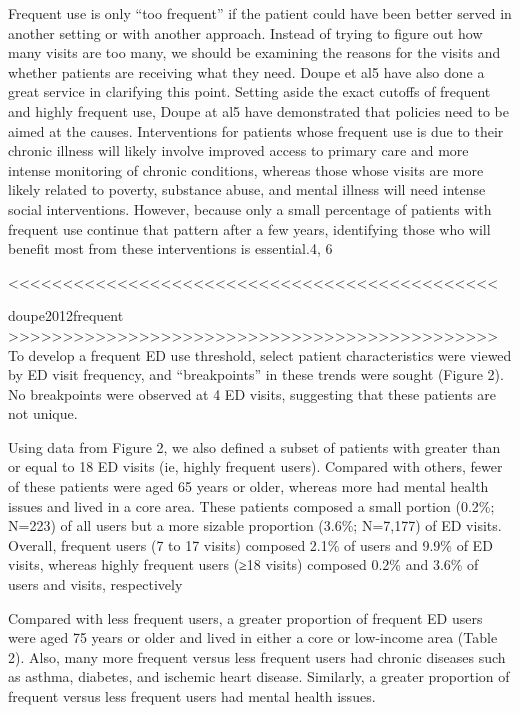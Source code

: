 Frequent use is only “too frequent” if the patient could have been better served in another setting or with another approach. Instead of trying to figure out how many visits are too many, we should be examining the reasons for the visits and whether patients are receiving what they need. Doupe et al5 have also done a great service in clarifying this point. Setting aside the exact cutoffs of frequent and highly frequent use, Doupe at al5 have demonstrated that policies need to be aimed at the causes. Interventions for patients whose frequent use is due to their chronic illness will likely involve improved access to primary care and more intense monitoring of chronic conditions, whereas those whose visits are more likely related to poverty, substance abuse, and mental illness will need intense social interventions. However, because only a small percentage of patients with frequent use continue that pattern after a few years, identifying those who will benefit most from these interventions is essential.4, 6

<<<<<<<<<<<<<<<<<<<<<<<<<<<<<<<<<<<<<<<<<<<<<



doupe2012frequent
>>>>>>>>>>>>>>>>>>>>>>>>>>>>>>>>>>>>>>>>>>>>>
To develop a frequent ED use threshold, select patient characteristics were viewed by ED visit frequency, and “breakpoints” in these trends were sought (Figure 2). No breakpoints were observed at 4 ED visits, suggesting that these patients are not unique.


Using data from Figure 2, we also defined a subset of patients with greater than or equal to 18 ED visits (ie, highly frequent users). Compared with others, fewer of these patients were aged 65 years or older, whereas more had mental health issues and lived in a core area. These patients composed a small portion (0.2\%; N=223) of all users but a more sizable proportion (3.6\%; N=7,177) of ED visits. Overall, frequent users (7 to 17 visits) composed 2.1\% of users and 9.9\% of ED visits, whereas highly frequent users (≥18 visits) composed 0.2\% and 3.6\% of users and visits, respectively 

Compared with less frequent users, a greater proportion of frequent ED users were aged 75 years or older and lived in either a core or low-income area (Table 2). Also, many more frequent versus less frequent users had chronic diseases such as asthma, diabetes, and ischemic heart disease. Similarly, a greater proportion of frequent versus less frequent users had mental health issues.

